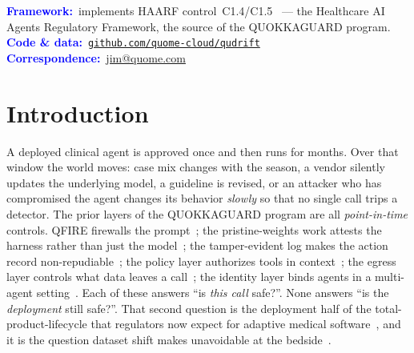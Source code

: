 \documentclass[11pt]{article}
\begin{document}
\begin{tcolorbox}[breakable, enhanced jigsaw, colback=black!4, colframe=black!4,
  arc=5pt, boxrule=0pt, left=16pt, right=16pt, top=10pt, bottom=10pt]
\medskip
\noindent\textcolor{blue}{\textbf{Framework:}}~implements HAARF control~C1.4/C1.5~\cite{schwoebel2026haarf} --- the Healthcare AI Agents Regulatory Framework, the source of the QUOKKAGUARD program.\\
\noindent\textcolor{blue}{\textbf{Code \& data:}}~\href{https://github.com/quome-cloud/qudrift}{\texttt{github.com/quome-cloud/qudrift}}\\
\noindent\textcolor{blue}{\textbf{Correspondence:}}~\href{mailto:jim@quome.com}{jim@quome.com}
\end{tcolorbox}

\vspace{2pt}
\vspace{0.3em}

\section{Introduction}\label{sec:intro}
A deployed clinical agent is approved once and then runs for months. Over that window
the world moves: case mix changes with the season, a vendor silently updates the
underlying model, a guideline is revised, or an attacker who has compromised the agent
changes its behavior \emph{slowly} so that no single call trips a detector. The prior
layers of the QUOKKAGUARD program are all \emph{point-in-time} controls. QFIRE firewalls
the prompt~\cite{schwoebel2026qfire}; the pristine-weights work attests the harness rather than
just the model~\cite{pristineweights2026}; the tamper-evident log makes the action record
non-repudiable~\cite{tamperaudit2026}; the policy layer authorizes tools in
context~\cite{policy2026}; the egress layer controls what data leaves a call~\cite{egress2026};
the identity layer binds agents in a multi-agent setting~\cite{multiagent2026}. Each of
these answers ``is \emph{this call} safe?''. None answers ``is the \emph{deployment} still
safe?''. That second question is the deployment half of the total-product-lifecycle that
regulators now expect for adaptive medical software~\cite{fda2021samd}, and it is the
question dataset shift makes unavoidable at the bedside~\cite{finlayson2021clinician}.
\end{document}
